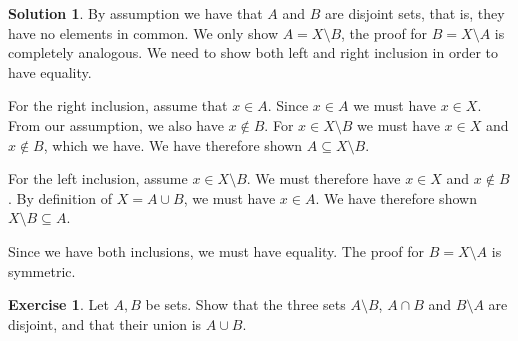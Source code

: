 \documentclass[a4paper, twocolumn]{report}
\newcounter{exercise} \numberwithin{exercise}{section}
\theoremstyle{definition}
\newtheorem{exc}[exercise]{Exercise}
\theoremstyle{solution}
\newtheorem*{sltn}{Solution}
\newcommand{\union}{\cup}
\newcommand{\intrsct}{\cap}
\begin{document}
\begin{sltn}
  By assumption we have that $A$ and $B$ are disjoint sets, that is, they have
  no elements in common.  We only show $A = X \setminus B$, the proof for $B =
  X \setminus A$ is completely analogous.  We need to show both left and right
  inclusion in order to have equality.

  For the right inclusion, assume that $x \in A$. Since $x \in A$ we must have
  $x \in X$.  From our assumption, we also have $x \notin B$. For $x \in X
  \setminus B$ we must have $x \in X$ and $x \notin B$, which we have.  We have
  therefore shown $A \subseteq X \setminus B$.

  For the left inclusion, assume $x \in X \setminus B$. We must therefore have
  $x \in X$ and $x \notin B$. By definition of $X = A \union B$, we must have
  $x \in A$. We have therefore shown $X \setminus B \subseteq A$.

  Since we have both inclusions, we must have equality.  The proof for $B = X
  \setminus A$ is symmetric.
\end{sltn}
  
\begin{exc}
  Let $A, B$ be sets. Show that the three sets $A \setminus B$, $A \intrsct B$
  and $B \setminus A$ are disjoint, and that their union is $A \union B$.
\end{exc}
\end{document}
